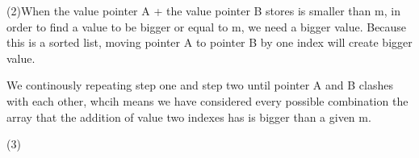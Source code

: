 \documentclass[12pt]{article}
\begin{document}
(2)When the value pointer A + the value pointer B stores is smaller than m, in order to find a value to be bigger or equal to m, we need a bigger value.
Because this is a sorted list, moving pointer A to pointer B by one index will create bigger value. 

We continously repeating step one and step two until pointer A and B clashes with each other, whcih means we have considered every
possible combination the array that the addition of value two indexes has  is bigger than a given m.

(3) 
\end{document}
